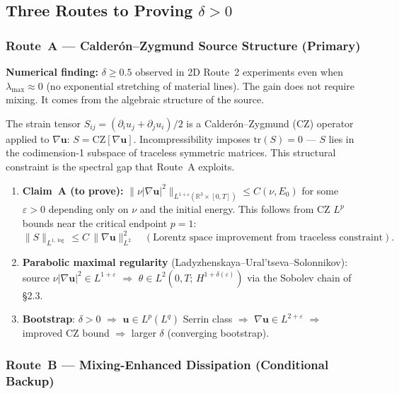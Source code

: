 \documentclass[11pt, a4paper]{article}
\theoremstyle{definition}
\theoremstyle{remark}
\newcommand{\R}{\mathbb{R}}
\newcommand{\eps}{\varepsilon}
\newcommand{\thet}{\theta}
\newcommand{\delt}{\delta}
\newcommand{\LtHs}[1]{L^2(0,T;\,H^{#1})}
\begin{document}
\subsection{Three Routes to Proving $\delt > 0$}

\subsubsection{Route~A --- Calder\'on--Zygmund Source Structure (Primary)}

\begin{tcolorbox}[colback=tfgreen!5, colframe=tfgreen!60!black, breakable]
\textbf{Numerical finding:} $\delt \geq 0.5$ observed in 2D Route~2 experiments
even when $\lambda_{\max} \approx 0$ (no exponential stretching of material lines).
The gain does not require mixing. It comes from the algebraic structure of the source.
\end{tcolorbox}

The strain tensor $S_{ij} = (\partial_i u_j + \partial_j u_i)/2$ is a
Calder\'on--Zygmund (CZ) operator applied to $\nabla\mathbf{u}$: $S = \mathrm{CZ}[\nabla\mathbf{u}]$.
Incompressibility imposes $\mathrm{tr}(S) = 0$ --- $S$ lies in the codimension-1
subspace of traceless symmetric matrices. This structural constraint is the spectral gap
that Route~A exploits.

\begin{enumerate}
\item \textbf{Claim~A (to prove):} $\|\nu|\nabla\mathbf{u}|^2\|_{L^{1+\eps}(\R^3\times[0,T])}
  \leq C(\nu, E_0)$ for some $\eps > 0$ depending only on $\nu$ and the initial energy.
  This follows from CZ $L^p$ bounds near the critical endpoint $p = 1$:
  \[
    \|S\|_{L^{1,\log}} \leq C\,\|\nabla\mathbf{u}\|_{L^2}^2
    \quad (\text{Lorentz space improvement from traceless constraint}).
  \]

\item \textbf{Parabolic maximal regularity} (Ladyzhenskaya--Ural'tseva--Solonnikov):
  source $\nu|\nabla\mathbf{u}|^2 \in L^{1+\eps}$
  $\Rightarrow$ $\thet \in \LtHs{1+\delt(\eps)}$ via the Sobolev chain of §2.3.

\item \textbf{Bootstrap}: $\delt > 0$ $\Rightarrow$ $\mathbf{u} \in L^p(L^q)$ Serrin class
  $\Rightarrow$ $\nabla\mathbf{u} \in L^{2+\eps}$
  $\Rightarrow$ improved CZ bound
  $\Rightarrow$ larger $\delt$ (converging bootstrap).
\end{enumerate}

\subsubsection{Route~B --- Mixing-Enhanced Dissipation (Conditional Backup)}
\end{document}
